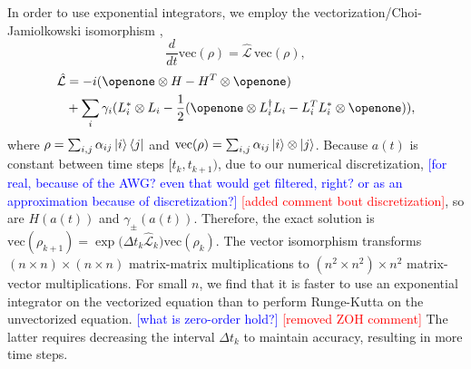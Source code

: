 In order to use exponential integrators, we employ
the vectorization/Choi-Jamiolkowski isomorphism \cite{Landi2018},
\begin{equation}
  \frac{d}{dt} \textrm{vec}({\rho}) = \hat{\mathcal{L}}\, \textrm{vec}({\rho}),
\end{equation}
\begin{equation}
  \begin{aligned}
    \hat{\mathcal{L}} &= -i(\openone \otimes H - H^{T} \otimes \openone)\\
    &+ \sum_{i} \gamma_{i}
    (L_{i}^{*} \otimes L_{i} - \frac{1}{2} (\openone \otimes L_{i}^{\dagger}L_{i}
    - L_{i}^{T}L_{i}^{*} \otimes \openone)),
  \end{aligned}
\end{equation}
where $\rho = \sum_{i, j} \alpha_{ij} \ket{i}\bra{j}$
and $\textrm{vec}(\rho) = \sum_{i, j} \alpha_{ij} \ket{i} \otimes \ket{j}$.
Because $a(t)$ is constant between time steps $[t_{k}, t_{k + 1})$,
  due to our numerical discretization,
  \textcolor{blue}{[for real, because of the AWG? even that would get filtered,
      right? or as an approximation because of discretization?]}
  \textcolor{red}{[added comment bout discretization]},
so are $H(a(t))$ and $\gamma_{\pm}(a(t))$.
Therefore, the exact solution is
$\textrm{vec}(\rho_{k + 1}) = {\exp}{\textstyle(}\Delta t_{k}
\hat{\mathcal{L}}_{k}{\textstyle)} \textrm{vec}(\rho_{k})$.
The vector isomorphism transforms $(n \times n) \times (n \times n)$
matrix-matrix multiplications to $(n^{2} \times n^{2}) \times n^{2}$ matrix-vector
multiplications. For small $n$, we find that it is
faster to use an exponential integrator on the vectorized equation than to perform
Runge-Kutta on the unvectorized equation.
\textcolor{blue}{[what is zero-order hold?]}
\textcolor{red}{[removed ZOH comment]}
The latter requires decreasing the interval $\Delta t_{k}$
to maintain accuracy, resulting in more time steps.
